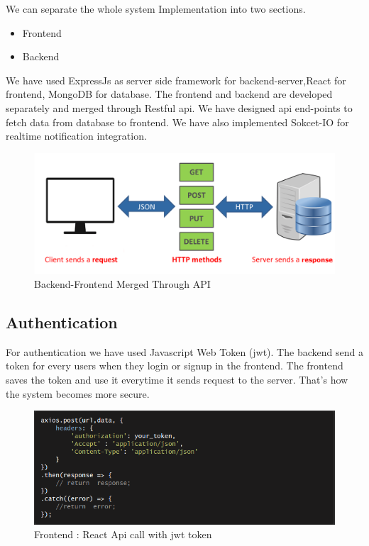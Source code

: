 \documentclass[10pt]{article}
\begin{document}
We can separate the whole system Implementation into two sections.

\begin{itemize}
  \item Frontend
  \item Backend
\end{itemize}

We have used ExpressJs as server side framework for backend-server,React for frontend, MongoDB for database.
The frontend and backend are developed separately and merged through Restful api. We have designed api end-points to fetch data from database to frontend. We have also implemented Sokcet-IO for realtime notification integration.

\begin{figure}[H]
  \centering
  \centerline{\includegraphics[width=\textwidth]{diagram/api.png}}
  \caption{Backend-Frontend Merged Through API}
  \label{fig}
\end{figure}


\subsection{Authentication}

For authentication we have used Javascript Web Token (jwt). The backend send a token for every users when they login or signup in the frontend. The frontend saves the token and use it everytime it sends request to the server. That's how the system becomes more secure.

\begin{figure}[H]
  \centering
  \centerline{\includegraphics[width=\textwidth]{api-call.png}}
  \caption{Frontend : React Api call with jwt token}
  \label{fig}
\end{figure}
\end{document}
